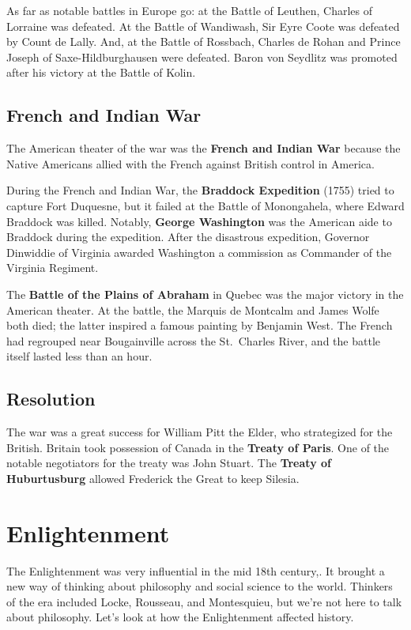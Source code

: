 As far as notable battles in Europe go: at the Battle of Leuthen, Charles of Lorraine was defeated.
At the Battle of Wandiwash, Sir Eyre Coote was defeated by Count de Lally.
And, at the Battle of Rossbach, Charles de Rohan and Prince Joseph of Saxe-Hildburghausen were defeated.
Baron von Seydlitz was promoted after his victory at the Battle of Kolin.

\subsection*{French and Indian War}

The American theater of the war was the \textbf{French and Indian War}
because the Native Americans allied with the French against British control in America.

During the French and Indian War, the \textbf{Braddock Expedition} (1755) tried to capture Fort Duquesne,
but it failed at the Battle of Monongahela, where Edward Braddock was killed.
Notably, \textbf{George Washington} was the American aide to Braddock during the expedition.
After the disastrous expedition,
Governor Dinwiddie of Virginia awarded Washington a commission as Commander of the Virginia Regiment.

The \textbf{Battle of the Plains of Abraham} in Quebec was the major victory in the American theater.
At the battle, the Marquis de Montcalm and James Wolfe both died;
the latter inspired a famous painting by Benjamin West.
The French had regrouped near Bougainville across the St.\ Charles River,
and the battle itself lasted less than an hour.

\subsection*{Resolution}

The war was a great success for William Pitt the Elder, who strategized for the British.
Britain took possession of Canada in the \textbf{Treaty of Paris}.
One of the notable negotiators for the treaty was John Stuart.
The \textbf{Treaty of Huburtusburg} allowed Frederick the Great to keep Silesia.

\section{Enlightenment}

The Enlightenment was very influential in the mid 18th century,.
It brought a new way of thinking about philosophy and social science to the world.
Thinkers of the era included Locke, Rousseau, and Montesquieu, but we're not here to talk about philosophy.
Let's look at how the Enlightenment affected history.

